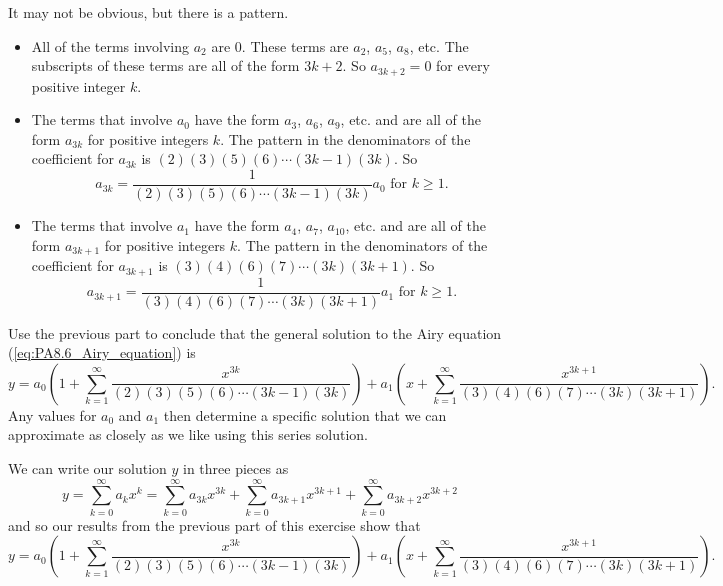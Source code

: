 \begin{exercises}
\begin{exerciseSolution}
It may not be obvious, but there is a pattern.
\begin{itemize}
\item All of the terms involving $a_2$ are 0. These terms are $a_2$, $a_5$, $a_8$, etc. The subscripts of these terms are all of the form $3k+2$. So $a_{3k+2} = 0$ for every positive integer $k$.
\item The terms that involve $a_0$ have the form $a_3$, $a_6$, $a_{9}$, etc. and are all of the form $a_{3k}$ for positive integers $k$. The pattern in the denominators of the coefficient for $a_{3k}$ is $(2)(3)(5)(6) \cdots (3k-1)(3k)$. So
    \[a_{3k} = \frac{1}{(2)(3)(5)(6) \cdots (3k-1)(3k)} a_0 \text{ for } k \geq 1.\]
\item The terms that involve $a_1$ have the form $a_4$, $a_7$, $a_{10}$, etc. and are all of the form $a_{3k+1}$ for positive integers $k$. The pattern in the denominators of the coefficient for $a_{3k+1}$ is $(3)(4)(6)(7) \cdots (3k)(3k+1)$. So
    \[a_{3k+1} = \frac{1}{(3)(4)(6)(7) \cdots (3k)(3k+1)} a_1 \text{ for } k \geq 1.\]
\end{itemize}

\end{exerciseSolution}

    \item Use the previous part to conclude that the general solution to the Airy equation (\ref{eq:PA8.6_Airy_equation}) is
\begin{equation*} %
y = a_0\left( 1+\sum_{k=1}^{\infty} \frac{x^{3k}}{(2)(3)(5)(6) \cdots (3k-1)(3k)} \right) + a_1 \left( x + \sum_{k=1}^{\infty} \frac{x^{3k+1}}{(3)(4)(6)(7) \cdots (3k)(3k+1)} \right).
\end{equation*}
Any values for $a_0$ and $a_1$ then determine a specific solution that we can approximate as closely as we like using this series solution.

\begin{exerciseSolution}

We can write our solution $y$ in three pieces as
\[y = \sum_{k = 0}^{\infty} a_kx^k = \sum_{k=0}^{\infty} a_{3k}x^{3k} + \sum_{k=0}^{\infty} a_{3k+1}x^{3k+1} + \sum_{k=0}^{\infty} a_{3k+2}x^{3k+2}\]
and so our results from the previous part of this exercise show that
\[y = a_0\left( 1+\sum_{k=1}^{\infty} \frac{x^{3k}}{(2)(3)(5)(6) \cdots (3k-1)(3k)} \right) + a_1 \left( x + \sum_{k=1}^{\infty} \frac{x^{3k+1}}{(3)(4)(6)(7) \cdots (3k)(3k+1)} \right).\]

\end{exerciseSolution}


\end{exercises}
